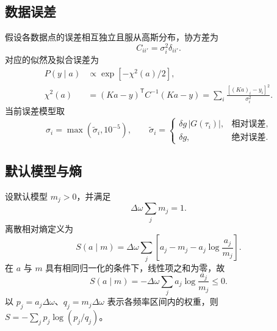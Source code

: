 \documentclass[UTF8,fontset=fandol,11pt]{ctexart}
\begin{document}
\subsection{数据误差}
假设各数据点的误差相互独立且服从高斯分布，协方差为
\begin{equation}
    C_{ii'}=\sigma_i^2\delta_{ii'}.
\end{equation}
对应的似然及拟合误差为
\begin{align}
    P(y\mid a)&\propto\exp[-\chi^2(a)/2],\\
    \chi^2(a)&=(Ka-y)^{\mathsf T}C^{-1}(Ka-y)=\sum_i\frac{[(Ka)_i-y_i]^2}{\sigma_i^2}.
\end{align}
当前误差模型取
\begin{equation}
    \sigma_i=\max(\widetilde\sigma_i,10^{-5}),\qquad
    \widetilde\sigma_i=\begin{cases}\delta g\,|G(\tau_i)|,&\text{相对误差},\\ \delta g,&\text{绝对误差}.\end{cases}
\end{equation}

\subsection{默认模型与熵}
设默认模型 $m_j>0$，并满足
\begin{equation}
    \Delta\omega\sum_jm_j=1.
\end{equation}
离散相对熵定义为
\begin{equation}
    S(a\mid m)=\Delta\omega\sum_j\left[a_j-m_j-a_j\log\frac{a_j}{m_j}\right].
\end{equation}
在 $a$ 与 $m$ 具有相同归一化的条件下，线性项之和为零，故
\begin{equation}
    S(a\mid m)=-\Delta\omega\sum_j a_j\log\frac{a_j}{m_j}\leq0.
    \label{eq:entropy}
\end{equation}
以 $p_j=a_j\Delta\omega$、$q_j=m_j\Delta\omega$ 表示各频率区间内的权重，则 $S=-\sum_jp_j\log(p_j/q_j)$。
\end{document}
